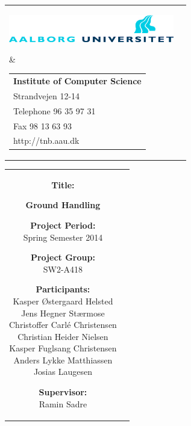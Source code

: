 \thispagestyle{empty}
\begin{titlepage}
	\setlength{\textwidth}{15cm}
	\noindent
	\begin{nopagebreak}
		{\samepage 
			\begin{tabular}{lr}
				\parbox{0.5\textwidth}{\raisebox{11mm}
					{\includegraphics[height=1.2cm]{Grafik/aauLogoDa}}
				} &
				\parbox{0.5\textwidth}{
					\small
					\begin{tabular}{l}
						{\sf\small \textbf{Institute of Computer Science}}\\
						{\sf\small Strandvejen 12-14} \\
						{\sf\small Telephone 96 35 97 31} \\
						{\sf\small Fax 98 13 63 93} \\
						{\sf\small http://tnb.aau.dk}
					\end{tabular}
				}
			\end{tabular}
			
			\noindent
			\begin{tabular}{cc}
				\parbox{7cm}{
					\begin{description}
			
						\item {\bf Title:} 
			
							\textbf{Ground Handling}\\
						\item {\bf Project Period:}\\
			  				Spring Semester 2014\\
			 				\hspace{4cm}
						\item {\bf Project Group:}\\
							SW2-A418\\
			  				\hspace{4cm}
						\item {\bf Participants:}\\
							Kasper Østergaard Helsted\\
                            Jens Hegner Stærmose\\
                            Christoffer Carlé Christensen\\
                            Christian Heider Nielsen\\
                            Kasper Fuglsang Christensen\\
                            Anders Lykke Matthiassen\\
                            Josias Laugesen\\
							\hspace{2cm}
						\item {\bf Supervisor:}\\
							Ramin Sadre\\


\end{description}}
\end{tabular}}
\end{nopagebreak}
\end{titlepage}
